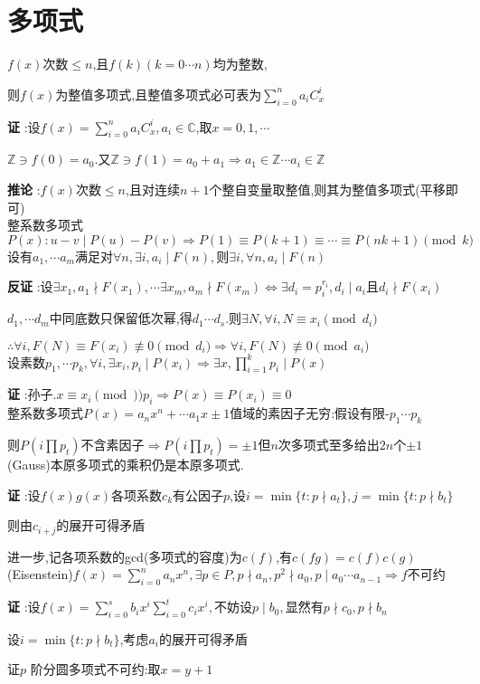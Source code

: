 \section{多项式}
$ f(x)$次数$ \le n$,且$ f(k)(k=0\cdots n)$均为整数,

则$ f(x)$为整值多项式,且整值多项式必可表为$ \sum_{i=0}^{n}{a_iC_x^i}$

{\bf 证 }:设$ f(x)=\sum_{i=0}^{n}{a_iC_x^i},a_i \in \mathbb{C}$,取$ x=0,1,\cdots$

$ \mathbb{Z}\ni f(0)=a_0$.又$ \mathbb{Z}\ni f(1)=a_0+a_1\Rightarrow a_1\in \mathbb{Z}\cdots a_i\in \mathbb{Z}$

{\bf 推论 }:$ f(x)$次数$ \le n$,且对连续$ n+1$个整自变量取整值,则其为整值多项式(平移即可)
\\

整系数多项式$ P(x):u-v \mid P(u)-P(v)\Rightarrow P(1)\equiv P(k+1) \equiv \cdots \equiv P(nk+1) \pmod k$
\\

设有$ a_1,\cdots a_m$满足对$ \forall n,\exists i,a_i\mid F(n),$则$ \exists i,\forall n,a_i\mid F(n)$

{\bf 反证 }:设$ \exists x_1, a_1 \nmid F(x_1),\cdots \exists x_m, a_m \nmid F(x_m)
\Leftrightarrow \exists d_i=p_i^{r_i},d_i \mid a_i$且$ d_i\nmid F(x_i)$

$ d_1,\cdots d_m$中同底数只保留低次幂,得$ d_1\cdots d_s.$则$ \exists N ,\forall i,N\equiv x_i \pmod{d_i}$

$ \therefore \forall i,F(N)\equiv F(x_i)\not\equiv 0 \pmod{d_i}\Rightarrow \forall i,F(N)\not\equiv 0 \pmod{a_i}$
\\

设素数$ p_1,\cdots p_k,\forall i ,\exists x_i,p_i \mid P(x_i)\Rightarrow \exists x ,\prod_{i=1}^{k}{p_i}\mid P(x)$

{\bf 证 }:孙子.$ x\equiv x_i \pmod)p_i\Rightarrow P(x)\equiv P(x_i)\equiv 0$
\\

整系数多项式$ P(x)=a_nx^n+\cdots a_1x\pm1$值域的素因子无穷:假设有限-$ p_1\cdots p_k$

则$ P(i\prod{p_t})$不含素因子$ \Rightarrow P(i\prod{p_t})=\pm 1$但$ n$次多项式至多给出$ 2n$个$ \pm 1$
\\

(Gauss)本原多项式的乘积仍是本原多项式.

{\bf 证 }:设$ f(x)g(x)$各项系数$ c_k$有公因子$ p$,设$ i=\min\{t: p \nmid a_t\},j=\min\{t: p\nmid b_t\}$

则由$ c_{i+j}$的展开可得矛盾

进一步,记各项系数的gcd(多项式的容度)为$ c(f)$,有$ c(fg)=c(f)c(g)$
\\

(Eisenstein)$ f(x)=\sum_{i=0}^{n}{a_nx^n},\exists p\in P,p \nmid a_n,p^2\nmid a_0,p \mid a_0\cdots a_{n-1}\Rightarrow f$不可约

{\bf 证 }:设$ f(x)=\sum_{i=0}^{s}{b_ix^i}\sum_{i=0}^{t}{c_ix^i},$不妨设$ p \mid b_0,$显然有$ p\nmid c_0,p\nmid b_n$

设$ i=\min\{ t:p\nmid b_t\}$,考虑$ a_i$的展开可得矛盾

证$ p$ 阶分圆多项式不可约:取$ x=y+1$
